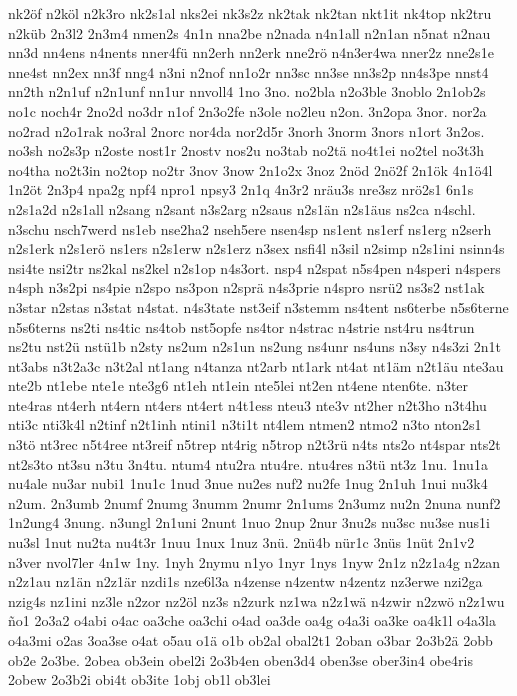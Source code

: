 {nk2öf
n2köl
n2k3ro
nk2s1al
nks2ei
nk3s2z
nk2tak
nk2tan
nkt1it
nk4top
nk2tru
n2küb
2n3l2
2n3m4
nmen2s
4n1n
nna2be
n2nada
n4n1all
n2n1an
n5nat
n2nau
nn3d
nn4ens
n4nents
nner4fü
nn2erh
nn2erk
nne2rö
n4n3er4wa
nner2z
nne2s1e
nne4st
nn2ex
nn3f
nng4
n3ni
n2nof
nn1o2r
nn3sc
nn3se
nn3s2p
nn4s3pe
nnst4
nn2th
n2n1uf
n2n1unf
nn1ur
nnvoll4
1no
3no.
no2bla
n2o3ble
3noblo
2n1ob2s
no1c
noch4r
2no2d
no3dr
n1of
2n3o2fe
n3ole
no2leu
n2on.
3n2opa
3nor.
nor2a
no2rad
n2o1rak
no3ral
2norc
nor4da
nor2d5r
3norh
3norm
3nors
n1ort
3n2os.
no3sh
no2s3p
n2oste
nost1r
2nostv
nos2u
no3tab
no2tä
no4t1ei
no2tel
no3t3h
no4tha
no2t3in
no2top
no2tr
3nov
3now
2n1o2x
3noz
2nöd
2nö2f
2n1ök
4n1ö4l
1n2öt
2n3p4
npa2g
npf4
npro1
npsy3
2n1q
4n3r2
nräu3s
nre3sz
nrö2s1
6n1s
n2s1a2d
n2s1all
n2sang
n2sant
n3s2arg
n2saus
n2s1än
n2s1äus
ns2ca
n4schl.
n3schu
nsch7werd
ns1eb
nse2ha2
nseh5ere
nsen4sp
ns1ent
ns1erf
ns1erg
n2serh
n2s1erk
n2s1erö
ns1ers
n2s1erw
n2s1erz
n3sex
nsfi4l
n3sil
n2simp
n2s1ini
nsinn4s
nsi4te
nsi2tr
ns2kal
ns2kel
n2s1op
n4s3ort.
nsp4
n2spat
n5s4pen
n4speri
n4spers
n4sph
n3s2pi
ns4pie
n2spo
ns3pon
n2sprä
n4s3prie
n4spro
nsrü2
ns3s2
nst1ak
n3star
n2stas
n3stat
n4stat.
n4s3tate
nst3eif
n3stemm
ns4tent
ns6terbe
n5s6terne
n5s6terns
ns2ti
ns4tic
ns4tob
nst5opfe
ns4tor
n4strac
n4strie
nst4ru
ns4trun
ns2tu
nst2ü
nstü1b
n2sty
ns2um
n2s1un
ns2ung
ns4unr
ns4uns
n3sy
n4s3zi
2n1t
nt3abs
n3t2a3c
n3t2al
nt1ang
n4tanza
nt2arb
nt1ark
nt4at
nt1äm
n2t1äu
nte3au
nte2b
nt1ebe
nte1e
nte3g6
nt1eh
nt1ein
nte5lei
nt2en
nt4ene
nten6te.
n3ter
nte4ras
nt4erh
nt4ern
nt4ers
nt4ert
n4t1ess
nteu3
nte3v
nt2her
n2t3ho
n3t4hu
nti3c
nti3k4l
n2tinf
n2t1inh
ntini1
n3ti1t
nt4lem
ntmen2
ntmo2
n3to
nton2s1
n3tö
nt3rec
n5t4ree
nt3reif
n5trep
nt4rig
n5trop
n2t3rü
n4ts
nts2o
nt4spar
nts2t
nt2s3to
nt3su
n3tu
3n4tu.
ntum4
ntu2ra
ntu4re.
ntu4res
n3tü
nt3z
1nu.
1nu1a
nu4ale
nu3ar
nubi1
1nu1c
1nud
3nue
nu2es
nuf2
nu2fe
1nug
2n1uh
1nui
nu3k4
n2um.
2n3umb
2numf
2numg
3numm
2numr
2n1ums
2n3umz
nu2n
2nuna
nunf2
1n2ung4
3nung.
n3ungl
2n1uni
2nunt
1nuo
2nup
2nur
3nu2s
nu3sc
nu3se
nus1i
nu3sl
1nut
nu2ta
nu4t3r
1nuu
1nux
1nuz
3nü.
2nü4b
nür1c
3nüs
1nüt
2n1v2
n3ver
nvol7ler
4n1w
1ny.
1nyh
2nymu
n1yo
1nyr
1nys
1nyw
2n1z
n2z1a4g
n2zan
n2z1au
nz1än
n2z1är
nzdi1s
nze6l3a
n4zense
n4zentw
n4zentz
nz3erwe
nzi2ga
nzig4s
nz1ini
nz3le
n2zor
nz2öl
nz3s
n2zurk
nz1wa
n2z1wä
n4zwir
n2zwö
n2z1wu
ño1
2o3a2
o4abi
o4ac
oa3che
oa3chi
o4ad
oa3de
oa4g
o4a3i
oa3ke
oa4k1l
o4a3la
o4a3mi
o2as
3oa3se
o4at
o5au
o1ä
o1b
ob2al
obal2t1
2oban
o3bar
2o3b2ä
2obb
ob2e
2o3be.
2obea
ob3ein
obel2i
2o3b4en
oben3d4
oben3se
ober3in4
obe4ris
2obew
2o3b2i
obi4t
ob3ite
1obj
ob1l
ob3lei
}
